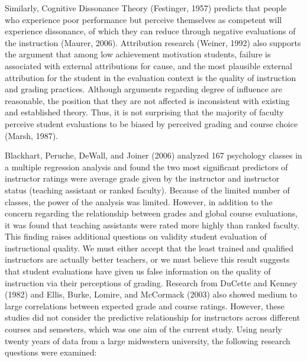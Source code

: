 \documentclass[,man]{apa6}
\theoremstyle{definition}
\theoremstyle{definition}
\theoremstyle{definition}
\theoremstyle{remark}
\begin{document}
Similarly, Cognitive Dissonance Theory (Festinger, 1957) predicts that
people who experience poor performance but perceive themselves as
competent will experience dissonance, of which they can reduce through
negative evaluations of the instruction (Maurer, 2006). Attribution
research (Weiner, 1992) also supports the argument that among low
achievement motivation students, failure is associated with external
attributions for cause, and the most plausible external attribution for
the student in the evaluation context is the quality of instruction and
grading practices. Although arguments regarding degree of influence are
reasonable, the position that they are not affected is inconsistent with
existing and established theory. Thus, it is not surprising that the
majority of faculty perceive student evaluations to be biased by
perceived grading and course choice (Marsh, 1987).

Blackhart, Peruche, DeWall, and Joiner (2006) analyzed 167 psychology
classes in a multiple regression analysis and found the two most
significant predictors of instructor ratings were average grade given by
the instructor and instructor status (teaching assistant or ranked
faculty). Because of the limited number of classes, the power of the
analysis was limited. However, in addition to the concern regarding the
relationship between grades and global course evaluations, it was found
that teaching assistants were rated more highly than ranked faculty.
This finding raises additional questions on validity student evaluation
of instructional quality. We must either accept that the least trained
and qualified instructors are actually better teachers, or we must
believe this result suggests that student evaluations have given us
false information on the quality of instruction via their perceptions of
grading. Research from DuCette and Kenney (1982) and Ellis, Burke,
Lomire, and McCormack (2003) also showed medium to large correlations
between expected grade and course ratings. However, these studies did
not consider the predictive relationship for instructors across
different courses and semesters, which was one aim of the current study.
Using nearly twenty years of data from a large midwestern university,
the following research questions were examined:
\end{document}

